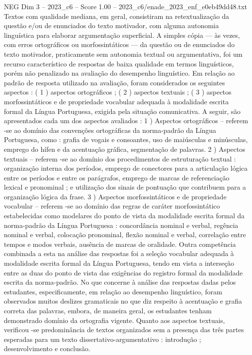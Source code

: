 \begin{textsample}{NEG Dim 3 – 2023\_c6 – Score 1.00 – 2023\_c6/enade\_2023\_enf\_e0eb49dd48.txt}
Textos com qualidade mediana, em geral, consistiram na retextualização da questão e/ou de enunciados do texto motivador, com alguma autonomia linguística para elaborar argumentação superficial.
A simples cópia — às vezes, com erros ortográficos ou morfossintáticos — da questão ou de enunciados do texto motivador, praticamente sem autonomia textual ou argumentativa, foi um recurso característico de respostas de baixa qualidade em termos linguísticos, porém não penalizado na avaliação do desempenho linguístico.
Em relação ao padrão de resposta utilizado na avaliação, foram considerados os seguintes aspectos : ( 1 ) aspectos ortográficos ; ( 2 ) aspectos textuais ; ( 3 ) aspectos morfossintáticos e de propriedade vocabular adequada à modalidade escrita formal da Língua Portuguesa, exigida pela situação comunicativa.
A seguir, são apresentados cada um dos aspectos avaliados : 1 ) Aspectos ortográficos – referem -se ao domínio das convenções ortográficas da norma-padrão da Língua Portuguesa, como : grafia de vogais e consoantes, uso de maiúsculas e minúsculas, emprego do hífen e da acentuação gráfica, segmentação de palavras. 2 ) Aspectos textuais – referem -se ao domínio dos procedimentos de estruturação textual : organização interna dos períodos, emprego de conectores para a articulação lógica entre os períodos e entre os parágrafos, emprego de marcas de referenciação lexical e pronominal ; e utilização dos sinais de pontuação que contribuem para a organização lógica da frase. 3 ) Aspectos morfossintáticos e de propriedade vocabular – referem -se ao domínio das regras de caráter morfossintático estabelecidas como modelares do ponto de vista da modalidade escrita formal da norma-padrão da Língua Portuguesa : concordância nominal e verbal, regência nominal e verbal, colocação pronominal, flexão nominal e verbal, correlação entre tempos e modos verbais, ausência de marcas de oralidade.
Outra competência combinada a esta na análise das respostas foi a seleção vocabular adequada à modalidade escrita formal da Língua Portuguesa, tendo em vista a interseção entre as duas do ponto de vista das exigências do registro formal da modalidade escrita da norma-padrão.
No que concerne à análise das respostas dadas pelos estudantes, especificamente, em relação ao desempenho linguístico, foram observados muitos deslizes gramaticais no que diz respeito à acentuação e grafia correta das palavras, embora, de maneira geral, os estudantes tenham demonstrado domínio da ortografia vigente.
Quanto aos aspectos textuais, verificou -se predominância de textos organizados sem a presença das três partes esperadas para um texto dissertativo-argumentativo : introdução ; desenvolvimento e conclusão.

\end{textsample}
